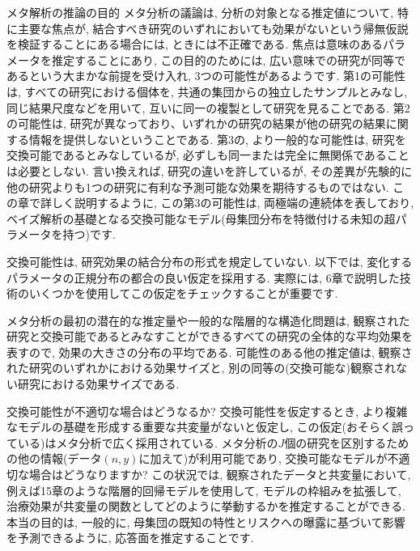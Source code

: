 \documentclass[10pt,dvipdfmx,a4]{beamer}
\begin{document}

\begin{frame}{メタ解析の推論の目的}
メタ分析の議論は, 分析の対象となる推定値について, 特に主要な焦点が, 結合すべき研究のいずれにおいても効果がないという帰無仮説を検証することにある場合には, ときには不正確である.
焦点は意味のあるパラメータを推定することにあり, この目的のためには, 広い意味での研究が同等であるという大まかな前提を受け入れ, 3つの可能性があるようです.
第1の可能性は, すべての研究における個体を, 共通の集団からの独立したサンプルとみなし, 同じ結果尺度などを用いて, 互いに同一の複製として研究を見ることである.
第2の可能性は, 研究が異なっており、いずれかの研究の結果が他の研究の結果に関する情報を提供しないということである.
第3の, より一般的な可能性は, 研究を交換可能であるとみなしているが, 必ずしも同一または完全に無関係であることは必要としない.
言い換えれば, 研究の違いを許しているが, その差異が先験的に他の研究よりも1つの研究に有利な予測可能な効果を期待するものではない.
この章で詳しく説明するように, この第3の可能性は, 両極端の連続体を表しており, ベイズ解析の基礎となる交換可能なモデル(母集団分布を特徴付ける未知の超パラメータを持つ)です.
\end{frame}


\begin{frame}
交換可能性は, 研究効果の結合分布の形式を規定していない.
以下では, 変化するパラメータの正規分布の都合の良い仮定を採用する.
実際には, 6章で説明した技術のいくつかを使用してこの仮定をチェックすることが重要です.

メタ分析の最初の潜在的な推定量や一般的な階層的な構造化問題は, 観察された研究と交換可能であるとみなすことができるすべての研究の全体的な平均効果を表すので, 効果の大きさの分布の平均である.
可能性のある他の推定値は, 観察された研究のいずれかにおける効果サイズと, 別の同等の(交換可能な)観察されない研究における効果サイズである.
\end{frame}


\begin{frame}{交換可能性が不適切な場合はどうなるか?}
交換可能性を仮定するとき, より複雑なモデルの基礎を形成する重要な共変量がないと仮定し, この仮定(おそらく誤っている)はメタ分析で広く採用されている.
メタ分析の$J$個の研究を区別するための他の情報(データ$(n,y)$に加えて)が利用可能であり, 交換可能なモデルが不適切な場合はどうなりますか?
この状況では, 観察されたデータと共変量において, 例えば15章のような階層的回帰モデルを使用して, モデルの枠組みを拡張して, 治療効果が共変量の関数としてどのように挙動するかを推定することができる.
本当の目的は, 一般的に, 母集団の既知の特性とリスクへの曝露に基づいて影響を予測できるように, 応答面を推定することです.
\end{frame}
\end{document}
